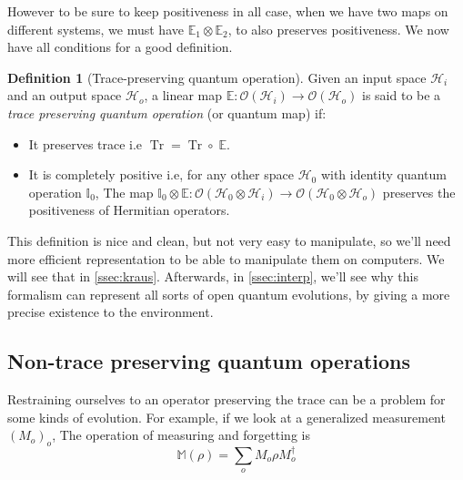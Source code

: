 \documentclass[10pt]{report}
\theoremstyle{plain}
\theoremstyle{definition}
\newtheorem{defn}{Definition}[chapter]
\theoremstyle{remark}
\DeclareMathOperator{\Tr}{Tr}
\begin{document}
However to be sure to keep positiveness in all case, when we have two maps on
different systems, we must have $\mathbb{E}_1
\otimes \mathbb{E}_2$, to also preserves positiveness. We now have all
conditions for a good definition.

\begin{defn}[Trace-preserving quantum operation]\label{def:tpqo}
  Given an input space $\mathcal{H}_i$ and an output space $\mathcal{H}_o$, a
  linear map $\mathbb E : \mathcal{O}(\mathcal{H}_i) \to
  \mathcal{O}(\mathcal{H}_o)$ is said to be a \emph{trace preserving quantum
    operation} (or quantum map) if:
  \begin{itemize}
  \item It preserves trace i.e $\Tr = \Tr \circ\; \mathbb E$.
  \item It is completely positive i.e, for any other space $\mathcal{H}_0$ with
    identity quantum operation $\mathbb I_0$, The map $\mathbb I_0 \otimes
    \mathbb E : \mathcal{O}(\mathcal{H}_0 \otimes \mathcal{H}_i) \to
    \mathcal{O}(\mathcal{H}_0 \otimes \mathcal{H}_o)$ preserves the positiveness
    of Hermitian operators.
  \end{itemize}
\end{defn}

This definition is nice and clean, but not very easy to manipulate, so we'll
need more efficient representation to be able to manipulate them on computers.
We will see that in \cref{ssec:kraus}. Afterwards, in \cref{ssec:interp}, we'll see
why this formalism can represent all sorts of open quantum evolutions, by giving
a more precise existence to the environment.

\subsection{Non-trace preserving quantum operations}

Restraining ourselves to an operator preserving the trace can be a problem for
some kinds of evolution. For example, if we look at a generalized measurement
${(M_o)}_o$, The operation of measuring and forgetting is
\[\mathbb{M}(\rho) = \sum_o M_o \rho M_o^\dagger\]
\end{document}

